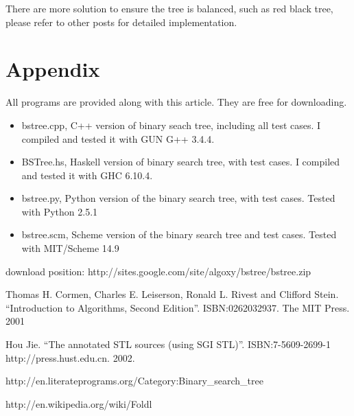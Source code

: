 \documentclass{article}
\begin{document}
There are more solution to ensure the tree is balanced, such as red black tree,
please refer to other posts for detailed implementation.

\section{Appendix} \label{appendix}
All programs are provided along with this article. They are free for downloading.
\begin{itemize}
\item bstree.cpp, C++ version of binary seach tree, including all test cases. I 
compiled and tested it with GUN G++ 3.4.4.
\item BSTree.hs, Haskell version of binary search tree, with test cases. I compiled
and tested it with GHC 6.10.4.
\item bstree.py, Python version of the binary search tree, with test cases. Tested
with Python 2.5.1
\item bstree.scm, Scheme version of the binary search tree and test cases. Tested
with MIT/Scheme 14.9
\end{itemize}
download position: http://sites.google.com/site/algoxy/bstree/bstree.zip

\begin{thebibliography}{99}

Thomas H. Cormen, Charles E. Leiserson, Ronald L. Rivest and Clifford Stein. 
``Introduction to Algorithms, Second Edition''. ISBN:0262032937. The MIT Press. 2001

Hou Jie. ``The annotated STL sources (using SGI STL)''. ISBN:7-5609-2699-1 http://press.hust.edu.cn. 2002.

http://en.literateprograms.org/Category:Binary\_search\_tree

http://en.wikipedia.org/wiki/Foldl

\end{thebibliography}

\ifx\wholebook\relax\else
\end{document}
